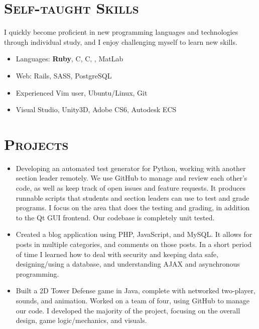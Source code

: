\documentclass[11pt,letterpaper]{article}
\newcommand{\CPP}
{C\nolinebreak[4]\hspace{-.05em}\raisebox{.22ex}{\footnotesize\bf ++}}
\newcommand{\CS}
{C\nolinebreak[4]\hspace{-.05em}\raisebox{.22ex}{\footnotesize\bf \#}}
\begin{document}
\begin{minipage}{\textwidth}
\section{\scshape Self-taught Skills}
\vspace{-2mm}
I quickly become proficient in new programming languages and technologies through individual study,
and I enjoy challenging myself to learn new skills.
\vspace{3mm}
\begin{itemize}
 \item Languages: {\bfseries Ruby}, \CPP, \CS, \textls{\LaTeX}, MatLab
 \item Web: Rails, SASS, PostgreSQL
 \item Experienced Vim user, Ubuntu/Linux, Git
 \item Visual Studio, Unity3D, Adobe CS6, Autodesk ECS
\end{itemize}

\vspace{-3mm}
\section{\scshape Projects}
\vspace{-2mm}

\begin{itemize}
 \item Developing an automated test generator for Python, working with another section leader remotely. We use GitHub to
 manage and review each other's code, as well as keep track of open issues and feature requests. It produces runnable
 scripts that students and section leaders can use to test and grade programs. I focus on the
 area that does the testing and grading, in addition to the Qt GUI frontend. Our codebase is
 completely unit tested.
 \item Created a blog application using PHP, JavaScript, and MySQL. It allows for posts in
 multiple categories, and comments on those posts. In a short period of time I learned how to deal with
 security and keeping data safe, designing/using a database, and understanding AJAX and asynchronous programming.
 \item Built a 2D Tower Defense game in Java, complete with networked two-player, sounds, and animation. Worked on 
 a team of four, using GitHub to manage our code. I developed the majority of the project, focusing on the
 overall design, game logic/mechanics, and visuals.
\end{itemize}



\end{minipage}
\end{document}
